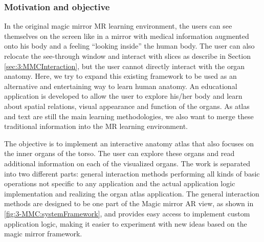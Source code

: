 \subsubsection{Motivation and objective}
In the original magic mirror MR learning environment, the users can see themselves on the screen like in a mirror with medical information augmented onto his body and a feeling ``looking inside'' the human body. The user can also relocate the see-through window and interact with slices as describe in Section \ref{sec:3:MMCInteraction}, but the user cannot directly interact with the organ anatomy. Here, we try to expand this existing framework to be used as an alternative and entertaining way to learn human anatomy. An educational application is developed to allow the user to explore his/her body and learn about spatial relations, visual appearance and function of the organs.
As atlas and text are still the main learning methodologies, we also want to merge these traditional information into the MR learning environment. 

The objective is to implement an interactive anatomy atlas that also focuses on the inner organs of the torso. The user can explore these organs and read additional information on each of the visualized organs. The work is separated into two different parts: general interaction methods performing all kinds of basic operations not specific to any application and the actual application logic implementation and realizing the organ atlas application.
The general interaction methods are designed to be one part of the Magic mirror AR view, as shown in \figurename{\ref{fig:3-MMC:systemFramework}}, and provides easy access to implement custom application logic, making it easier to experiment with new ideas based on the magic mirror framework.

